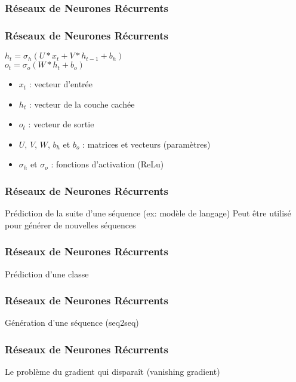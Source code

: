 \begin{frame}
  \frametitle{Réseaux de Neurones Récurrents}
\end{frame}

\begin{frame}
  \frametitle{Réseaux de Neurones Récurrents}
  $h_{t}=\sigma_{h}(U*x_{t}+V*h_{t-1}+b_{h})$ \\
  $o_{t}=\sigma_{o}(W*h_{t}+b_{o})$ \\
  \begin{itemize}
  \item $x_{t}$ : vecteur d'entrée
  \item $h_t$ : vecteur de la couche cachée
  \item $o_{t}$ : vecteur de sortie
  \item $U$, $V$, $W$, $b_h$ et $b_o$ : matrices et vecteurs (paramètres)
  \item $\sigma_{h}$ et $\sigma_o$ : fonctions d'activation (ReLu)
  \end{itemize}
\end{frame}

\begin{frame}
  \frametitle{Réseaux de Neurones Récurrents}
  Prédiction de la suite d'une séquence (ex: modèle de langage)
  Peut être utilisé pour générer de nouvelles séquences
\end{frame}

\begin{frame}
  \frametitle{Réseaux de Neurones Récurrents}
  Prédiction d'une classe
\end{frame}

\begin{frame}
  \frametitle{Réseaux de Neurones Récurrents}
  Génération d'une séquence (seq2seq)
\end{frame}

\begin{frame}
  \frametitle{Réseaux de Neurones Récurrents}
  Le problème du gradient qui disparaît (vanishing gradient)
\end{frame}
